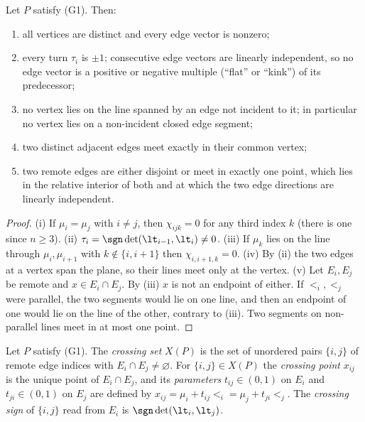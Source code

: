 \begin{lemma}\label{lem:g1}\leanok
Let $P$ satisfy (G1). Then:
\begin{enumerate}
\item[(i)] all vertices are distinct and every edge vector is nonzero;
\item[(ii)] every turn $\tau_i$ is $\pm1$; consecutive edge vectors are
linearly independent, so no edge vector is a positive or negative multiple
(``flat'' or ``kink'') of its predecessor;
\item[(iii)] no vertex lies on the line spanned by an edge not incident to it;
in particular no vertex lies on a non-incident closed edge segment;
\item[(iv)] two distinct adjacent edges meet exactly in their common vertex;
\item[(v)] two remote edges are either disjoint or meet in exactly one point,
which lies in the relative interior of both and at which the two edge
directions are linearly independent.
\end{enumerate}

\end{lemma}
\begin{proof}\leanok
(i) If $\mu_i=\mu_j$ with $i\neq j$, then $\chi_{ijk}=0$ for any third index
$k$ (there is one since $n\geq3$). (ii) $\tau_i=\sgn\det(\lt_{i-1},\lt_i)\neq0$.
(iii) If $\mu_k$ lies on the line through $\mu_i,\mu_{i+1}$ with
$k\notin\{i,i+1\}$ then $\chi_{i,i+1,k}=0$. (iv) By (ii) the two edges at a
vertex span the plane, so their lines meet only at the vertex. (v) Let
$E_i,E_j$ be remote and $x\in E_i\cap E_j$. By (iii) $x$ is not an endpoint
of either. If $\lt_i,\lt_j$ were parallel, the two segments would lie on one
line, and then an endpoint of one would lie on the line of the other, contrary
to (iii). Two segments on non-parallel lines meet in at most one point.
\end{proof}

\begin{definition}[crossings]\label{def:crossings}\leanok
Let $P$ satisfy (G1). The \emph{crossing set} $X(P)$ is the set of unordered
pairs $\{i,j\}$ of remote edge indices with $E_i\cap E_j\neq\varnothing$. For
$\{i,j\}\in X(P)$ the \emph{crossing point} $x_{ij}$ is the unique point of
$E_i\cap E_j$, and its \emph{parameters} $t_{ij}\in(0,1)$ on $E_i$ and
$t_{ji}\in(0,1)$ on $E_j$ are defined by $x_{ij}=\mu_i+t_{ij}\lt_i
=\mu_j+t_{ji}\lt_j$. The \emph{crossing sign} of $\{i,j\}$ read from $E_i$ is
$\sgn\det(\lt_i,\lt_j)$.
\end{definition}

